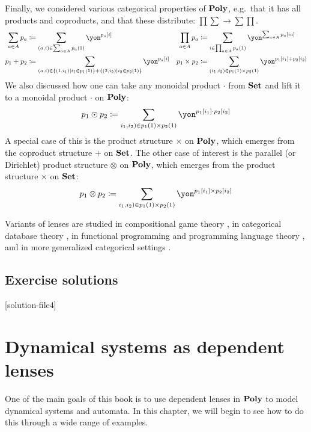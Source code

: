 \documentclass[Book-Poly]{subfiles}
\begin{document}
Finally, we considered various categorical properties of $\mathbf{Poly}$, e.g.\ that it has all products and coproducts, and that these distribute: $\prod\sum\to\sum\prod$.
\begin{align*}
	\sum_{a\in A}p_a&\coloneqq\sum_{(a,i)\in\sum_{a\in A}p_a(1)}\yon^{p_a[i]}&
	\prod_{a\in A}p_a&\coloneqq\sum_{i\in\prod_{a\in A}p_a(1)}\yon^{\sum_{a\in A}p_a[i a]}
\\
	p_1+p_2&\coloneqq\sum_{(a,i)\in\{(1,i_1)\mid i_1\in p_1(\1)\}+\{(2,i_2)\mid i_2\in p_2(\1)\}}\yon^{p_a[i]}&
	p_1\times p_2&\coloneqq\sum_{(i_1,i_2)\in p_1(1)\times p_2(1)}\yon^{p_1[i_1]+p_2[i_2]}
\end{align*}
We also discussed how one can take any monoidal product $\cdot$ from $\mathbf{Set}$ and lift it to a monoidal product $\cdot$ on $\mathbf{Poly}$:
\[
	p_1\odot p_2\coloneqq\sum_{i_1,i_2)\in p_1(1)\times p_2(1)}\yon^{p_1[i_1]\cdot p_2[i_2]}
\]
A special case of this is the product structure $\times$ on $\mathbf{Poly}$, which emerges from the coproduct structure $+$ on $\mathbf{Set}$. The other case of interest is the parallel (or Dirichlet) product structure $\otimes$ on $\mathbf{Poly}$, which emerges from the product structure $\times$ on $\mathbf{Set}$:
\[
	p_1\otimes p_2\coloneqq\sum_{i_1,i_2)\in p_1(1)\times p_2(1)}\yon^{p_1[i_1]\times p_2[i_2]}
\]

Variants of lenses are studied in compositional game theory \cite{hedges2016compositionality,hedges2017coherence,hedges2018limits,hedges2018morphisms}, in categorical database theory \cite{johnson2012lenses}, in functional programming and programming language theory \cite{bohannon2006relational,oconnor2011functor,abou2016reflections}, and in more generalized categorical settings \cite{gibbons2012relating,spivak2019generalized}.

\section{Exercise solutions}
{\footnotesize
}

[solution-file4]

\chapter{Dynamical systems as dependent lenses} \label{ch.poly.dyn_sys}

One of the main goals of this book is to use dependent lenses in $\mathbf{Poly}$ to model dynamical systems and automata.
In this chapter, we will begin to see how to do this through a wide range of examples.
\end{document}
